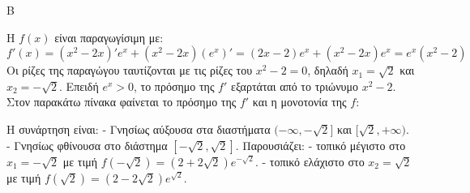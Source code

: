 \begin{thema}{Β}
\begin{erwthma}
\item Η $f(x)$ είναι παραγωγίσιμη με:
\[ f'(x) = (x^2-2x)'e^x + (x^2-2x)(e^x)' = (2x-2)e^x + (x^2-2x)e^x = e^x(x^2-2) \]
Οι ρίζες της παραγώγου ταυτίζονται με τις ρίζες του $x^2-2=0$, δηλαδή $x_1 = \sqrt{2}$ και $x_2 = -\sqrt{2}$.
Επειδή $e^x > 0$, το πρόσημο της $f'$ εξαρτάται από το τριώνυμο $x^2-2$.
Στον παρακάτω πίνακα φαίνεται το πρόσημο της $f'$ και η μονοτονία της $f$:
\begin{center}
\end{center}
Η συνάρτηση είναι:
- Γνησίως αύξουσα στα διαστήματα $(-\infty, -\sqrt{2}]$ και $[\sqrt{2}, +\infty)$.
- Γνησίως φθίνουσα στο διάστημα $[-\sqrt{2}, \sqrt{2}]$.
Παρουσιάζει:
- τοπικό μέγιστο στο $x_1 = -\sqrt{2}$ με τιμή $f(-\sqrt{2}) = (2+2\sqrt{2})e^{-\sqrt{2}}$.
- τοπικό ελάχιστο στο $x_2 = \sqrt{2}$ με τιμή $f(\sqrt{2}) = (2-2\sqrt{2})e^{\sqrt{2}}$.
\end{erwthma}
\end{thema}

